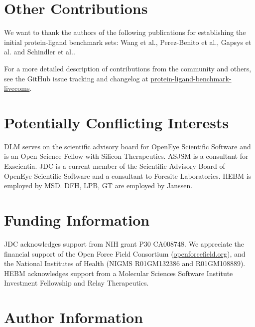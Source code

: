 \documentclass[9pt,bestpractices,pubversion]{livecoms}
\newcommand{\githubrepository}{\href{https://github.com/openforcefield/FE-Benchmarks-Best-Practices}{protein-ligand-benchmark-livecoms}}  %
\begin{document}
\section{Other Contributions}
%

We want to thank the authors of the following publications for establishing the initial protein-ligand benchmark sets: Wang et al.\cite{wang_accurate_2015}, Perez-Benito et al.\cite{perez-benito_predicting_2019}, Gapsys et al.\cite{gapsys_large_2020} and Schindler et al.\cite{schindler_largescale_2020}.

For a more detailed description of contributions from the community and others, see the GitHub issue tracking and changelog at \githubrepository.

\section{Potentially Conflicting Interests}

DLM serves on the scientific advisory board for OpenEye Scientific Software and is an Open Science Fellow with Silicon Therapeutics.
ASJSM is a consultant for Exscientia.
JDC is a current member of the Scientific Advisory Board of OpenEye Scientific Software and a consultant to Foresite Laboratories.
HEBM is employed by MSD. DFH, LPB, GT are employed by Janssen. 

\section{Funding Information}
JDC acknowledges support from NIH grant P30 CA008748.
We appreciate the financial support of the Open Force Field Consortium (\href{https://openforcefield.org}{openforcefield.org}), and the National Institutes of Health (NIGMS R01GM132386 and R01GM108889).
HEBM acknowledges support from a Molecular Sciences Software Institute Investment Fellowship and Relay Therapeutics.


\section*{Author Information}
\makeorcid




\end{document}
